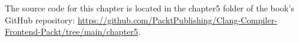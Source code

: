 
The source code for this chapter is located in the chapter5 folder of the book's GitHub repository: \url{https://github.com/PacktPublishing/Clang-Compiler-Frontend-Packt/tree/main/chapter5}.
